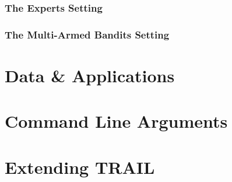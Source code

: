 \documentclass[a4paper,twoside,11pt]{article}
\newcommand{\trail}{\textsf{\small TRAIL}}
\theoremstyle{definition}
\begin{document}
\subsubsection{The Experts Setting}
\subsubsection{The Multi-Armed Bandits Setting}
\section{Data \& Applications}
\section{Command Line Arguments}
\section{Extending \trail}
\label{sec:cmd}

\end{document}
